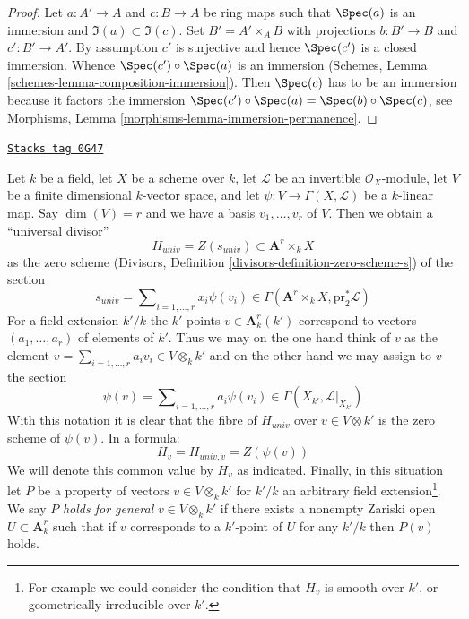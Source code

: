 \begin{proof}
\medskip\noindent
Let $a : A' \to A$ and $c : B \to A$ be ring maps such that
$\Spec(a)$ is an immersion and $\Im(a) \subset \Im(c)$.
Set $B' = A' \times_A B$ with projections $b : B' \to B$
and $c' : B' \to A'$. By assumption $c'$
is surjective and hence $\Spec(c')$ is a closed immersion.
Whence $\Spec(c') \circ \Spec(a)$ is an immersion
(Schemes, Lemma \ref{schemes-lemma-composition-immersion}).
Then $\Spec(c)$ has to be an immersion because it factors
the immersion $\Spec(c') \circ \Spec(a) = \Spec(b) \circ \Spec(c)$, see
Morphisms, Lemma \ref{morphisms-lemma-immersion-permanence}.
\end{proof}

\begin{definition}
\label{varieties-situation-family-divisors}
\href{https://stacks.math.columbia.edu/tag/0G47}{\texttt{Stacks tag 0G47}}

Let $k$ be a field,
let $X$ be a scheme over $k$,
let $\mathcal{L}$ be an invertible $\mathcal{O}_X$-module,
let $V$ be a finite dimensional $k$-vector space, and
let $\psi : V \to \Gamma(X, \mathcal{L})$ be a $k$-linear map.
Say $\dim(V) = r$ and we have a basis $v_1, \ldots, v_r$ of $V$.
Then we obtain a ``universal divisor''
$$
H_{univ} = Z(s_{univ}) \subset  \mathbf{A}^r \times_k X
$$
as the zero scheme
(Divisors, Definition \ref{divisors-definition-zero-scheme-s}) of the section
$$
s_{univ} = \sum\nolimits_{i = 1, \ldots, r} x_i \psi(v_i) \in
\Gamma(\mathbf{A}^r \times_k X, \text{pr}_2^*\mathcal{L})
$$
For a field extension $k'/k$ the $k'$-points $v \in \mathbf{A}^r_k(k')$
correspond to vectors $(a_1, \ldots, a_r)$ of elements of $k'$.
Thus we may on the one hand think of $v$ as the element
$v = \sum_{i = 1, \ldots, r} a_i v_i \in V \otimes_k k'$
and on the other hand we may assign to $v$ the section
$$
\psi(v) = \sum\nolimits_{i = 1, \ldots, r} a_i \psi(v_i) \in
\Gamma(X_{k'}, \mathcal{L}|_{X_{k'}})
$$
With this notation it is clear that the fibre of $H_{univ}$ over
$v \in V \otimes k'$ is the zero scheme of $\psi(v)$.
In a formula:
$$
H_v = H_{univ, v} = Z(\psi(v))
$$
We will denote this common value by $H_v$ as indicated. Finally, in
this situation let $P$ be a property of vectors $v \in V \otimes_k k'$
for $k'/k$ an arbitrary field extension\footnote{For example we could
consider the condition that $H_v$ is smooth over $k'$, or geometrically
irreducible over $k'$.}. We say $P$ {\it holds for general}
$v \in V \otimes_k k'$ if there exists a nonempty Zariski open
$U \subset \mathbf{A}^r_k$ such that if $v$ corresponds to a $k'$-point
of $U$ for any $k'/k$ then $P(v)$ holds.
\end{definition}

